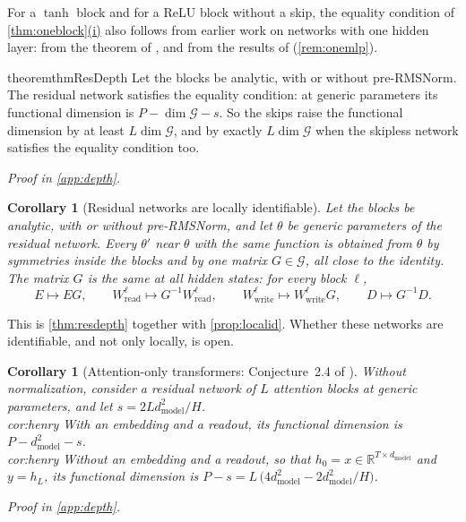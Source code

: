 \documentclass[10pt]{article}
\newtheorem{corollary}[theorem]{Corollary}
\theoremstyle{definition}
\theoremstyle{remark}
\newcommand{\R}{\mathbb{R}}
\newcommand{\Wread}{W_{\mathrm{read}}}
\newcommand{\Wwrite}{W_{\mathrm{write}}}
\newcommand{\dm}{d_{\mathrm{model}}}
\newcommand{\G}{\mathcal{G}}
\newcommand{\ptlabel}[1]{\phantomsection\label{#1}}
\DeclareRobustCommand{\cpref}[2]{\hyperref[#1:#2]{\cref*{#1}(#2)}}
\newcommand{\proofin}[1]{\par\vspace{-0.4\baselineskip}\noindent\hfill{\small\itshape Proof in \cref{#1}.}\par\smallskip}
\newcommand{\stpart}[3]{\ifx\relax#1\relax\else\ptlabel{#1:#2}\fi{\upshape\bfseries\boldmath(#2)\ifx\relax#3\relax\else\ #3.\fi}}
\begin{document}
For a $\tanh$ block and for a ReLU block without a skip, the equality condition of \cpref{thm:oneblock}{i} also follows from earlier work on networks with one hidden layer: from the theorem of \citet{sussmann1992}, and from the results of \citet{stock2021embedding} (\cref{rem:onemlp}).

\begin{restatable}{theorem}{thmResDepth}\label{thm:resdepth}
Let the blocks be analytic, with or without pre-RMSNorm. The residual network satisfies the equality condition: at generic parameters its functional dimension is $P - \dim\G - s$. So the skips raise the functional dimension by at least $L\dim\G$, and by exactly $L\dim\G$ when the skipless network satisfies the equality condition too.
\end{restatable}
\proofin{app:depth}

\begin{corollary}[Residual networks are locally identifiable]\label{cor:localid}
Let the blocks be analytic, with or without pre-RMSNorm, and let $\theta$ be generic parameters of the residual network. Every $\theta'$ near $\theta$ with the same function is obtained from $\theta$ by symmetries inside the blocks and by one matrix $G \in \G$, all close to the identity. The matrix $G$ is the same at all hidden states: for every block $\ell$,
\[
E \mapsto EG, \qquad \Wread^{\ell} \mapsto G^{-1}\Wread^{\ell}, \qquad \Wwrite^{\ell} \mapsto \Wwrite^{\ell}G, \qquad D \mapsto G^{-1}D.
\]
\end{corollary}

This is \cref{thm:resdepth} together with \cref{prop:localid}. Whether these networks are identifiable, and not only locally, is open.

\begin{corollary}[Attention-only transformers: Conjecture~2.4 of \citealp{henry2026generic}]\label{cor:henry}
Without normalization, consider a residual network of $L$ attention blocks at generic parameters, and let $s = 2L\dm^2/H$.\\
\stpart{cor:henry}{i}{} With an embedding and a readout, its functional dimension is $P - \dm^2 - s$.\\
\stpart{cor:henry}{ii}{} Without an embedding and a readout, so that $h_0 = x \in \R^{T\times\dm}$ and $y = h_L$, its functional dimension is $P - s = L\,\big(4\dm^2 - 2\dm^2/H\big)$.
\end{corollary}
\proofin{app:depth}
\end{document}
